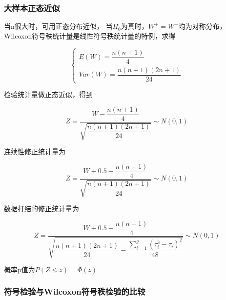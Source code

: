 \documentclass[UTF8]{ctexart}
\numberwithin{equation}{section}
\begin{document}
\subsubsection{大样本正态近似}
当n很大时，可用正态分布近似，
当$H_0$为真时，$W^+=W^-$均为对称分布，
Wilcoxon符号秩统计量是线性符号秩统计量的特例，求得

\begin{equation}
    \begin{cases}
        E(W) = \dfrac{n(n+1)}{4}\\[2em]
        Var(W) = \dfrac{n(n+1)(2n+1)}{24}
    \end{cases}
    \nonumber
\end{equation}

检验统计量做正态近似，得到

\begin{equation}
    Z = \dfrac{W - \dfrac{n(n+1)}{4}}{\sqrt{\dfrac{n(n+1)(2n+1)}{24}}} \sim N(0, 1)
\end{equation}

连续性修正统计量为

\begin{equation}
    Z = \dfrac{W + 0.5 - \dfrac{n(n+1)}{4}}{\sqrt{\dfrac{n(n+1)(2n+1)}{24}}} \sim N(0, 1)
\end{equation}

数据打结的修正统计量为

\begin{equation}
    Z = \dfrac{W + 0.5 - \dfrac{n(n+1)}{4}}{\sqrt{\dfrac{n(n+1)(2n+1)}{24}-\dfrac{\sum_{i=1}^{g} (\tau_i^3 - \tau_i)^2}{48}}}
    \sim N(0, 1)
\end{equation}

概率p值为$P(Z \leq z)=\Phi(z)$

\subsubsection{符号检验与Wilcoxon符号秩检验的比较}
\end{document}
